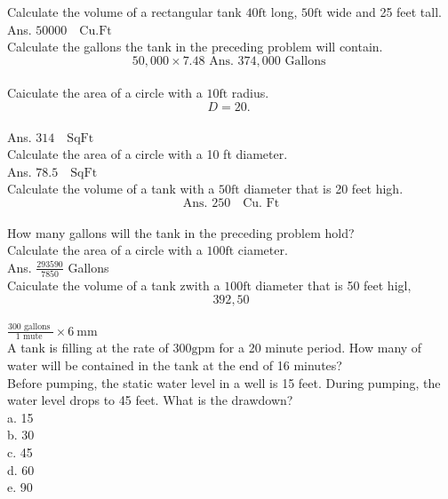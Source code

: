 Calculate the volume of a rectangular tank $40 \mathrm{ft}$ long, $50 \mathrm{ft}$ wide and 25 feet tall.\\
Ans. $50000 \quad \mathrm{Cu} . \mathrm{Ft}$\\

Calculate the gallons the tank in the preceding problem will contain.\\
$$50,000 \times 7.48 \text { Ans. } 374,000 \text { Gallons }$$\\

Caiculate the area of a circle with a $10 \mathrm{ft}$ radius.\\
$$D=20 \text {. }$$\\
Ans. $314 \quad \mathrm{Sq} \mathrm{Ft}$\\

Calculate the area of a circle with a 10 ft diameter.\\
Ans. $78.5 \quad \mathrm{Sq} \mathrm{Ft}$\\

Calculate the volume of a tank with a $50 \mathrm{ft}$ diameter that is 20 feet high.\\
$$\text { Ans. } 250 \quad \mathrm{Cu} \text {. Ft }$$\\

How many gallons will the tank in the preceding problem hold?\\

Calculate the area of a circle with a $100 \mathrm{ft}$ ciameter.\\
Ans. $\frac{293590}{7850}$ Gallons\\

Caiculate the volume of a tank zwith a $100 \mathrm{ft}$ diameter that is 50 feet higl,\\
$$392,50$$\\
$\frac{300 \text { gallons }}{1 \text { mute }} \times 6 \mathrm{~mm}$\\

A tank is filling at the rate of $300 \mathrm{gpm}$ for a 20 minute period. How many of water will be contained in the tank at the end of 16 minutes?\\

Before pumping, the static water level in a well is 15 feet. During pumping, the water level drops to 45 feet. What is the drawdown?\\
a. 15\\
b. 30\\
c. 45\\
d. 60\\
e. 90\\

